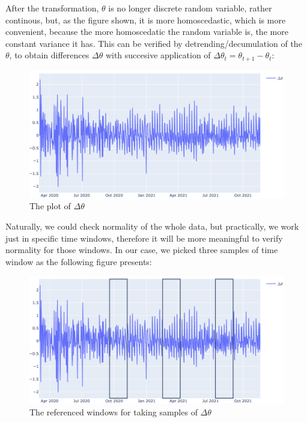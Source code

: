 \documentclass[
  digital, %
  oneside, %
  lof,     %
  lot,     %
]{fithesis4}
\begin{document}
After the transformation, $\theta$ is no 
longer discrete random variable, rather 
continous, but, as the figure shown, it 
is more homoscedastic, which is more 
convenient, because the more homoscedatic 
the random variable is, the more constant variance 
it has. 
This can be verified by detrending/decumulation 
of the $\theta$, to obtain differences 
$\Delta \theta$ with succesive application of 
$\Delta \theta_t = \theta_{t+1} - \theta_{t}$:

\begin{figure}[h]
  \begin{center}
    \includegraphics[width=\textwidth]{images/theta-diff-figure.png}
  \end{center}
  \caption{The plot of $\Delta \theta$}
  \label{fig:theta-diff}
\end{figure}

Naturally, we could check normality of the 
whole data, but practically, we work just in 
specific time windows, therefore it will be 
more meaningful to verify normality for those 
windows. In our case, we picked three samples 
of time window as the following figure presents:

\begin{figure}[h]
  \begin{center}
    \includegraphics[width=\textwidth]{images/theta-sample-windows.png}
  \end{center}
  \caption{The referenced windows for taking samples of $\Delta \theta$}
  \label{fig:theta-sample-windows}
\end{figure}
\end{document}
